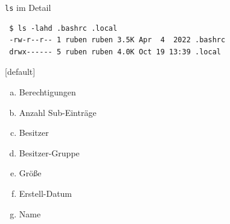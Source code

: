\documentclass[compress]{beamer}
\begin{document}
\begin{frame}[fragile]{\texttt{ls} im Detail}
\begin{verbatim}
 $ ls -lahd .bashrc .local
 -rw-r--r-- 1 ruben ruben 3.5K Apr  4  2022 .bashrc
 drwx------ 5 ruben ruben 4.0K Oct 19 13:39 .local
\end{verbatim}

\hspace*{0.2mm}
{
[default]
\begin{enumerate}[a)]
\item Berechtigungen
\item Anzahl Sub-Einträge
\item Besitzer
\item Besitzer-Gruppe
\item Größe
\item Erstell-Datum
\item Name
\end{enumerate}
}

\end{frame}
\end{document}
